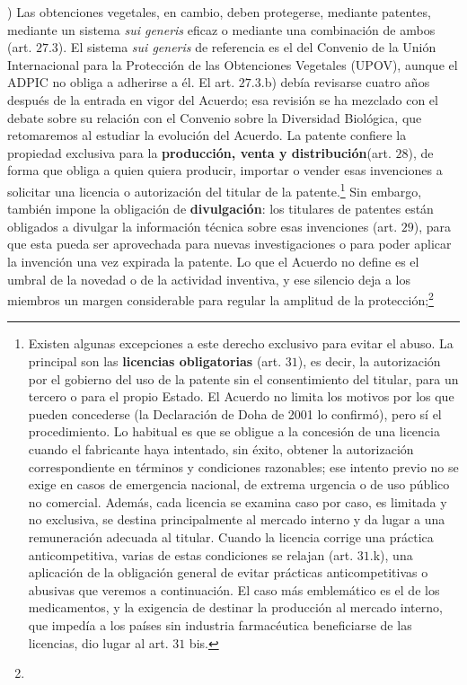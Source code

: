 \documentclass[10pt,a4paper]{article}
\newcounter{alphaitem}
\newenvironment{la}
      {\begin{list}{\alph{alphaitem})}{%
          \usecounter{alphaitem}%
          \setlength{\leftmargin}{1cm}%
          \setlength{\parskip}{3pt}%
          \setlength{\itemsep}{0pt}%
          \setlength{\parsep}{0pt}%
      }}
      {\end{list}}
\begin{document}
\begin{la}
{        Las obtenciones vegetales, en cambio, deben protegerse, mediante patentes, mediante un sistema \textit{sui generis} eficaz o mediante una combinación de ambos (art. $27.3$). El sistema \textit{sui generis} de referencia es el del Convenio de la Unión Internacional para la Protección de las Obtenciones Vegetales (UPOV), aunque el ADPIC no obliga a adherirse a él. El art. $27.3$.b) debía revisarse cuatro años después de la entrada en vigor del Acuerdo; esa revisión se ha mezclado con el debate sobre su relación con el Convenio sobre la Diversidad Biológica, que retomaremos al estudiar la evolución del Acuerdo.
    } La patente confiere la propiedad exclusiva para la \textbf{producción, venta y distribución}(art. $28$), de forma que obliga a quien quiera producir, importar o vender esas invenciones a solicitar una licencia o autorización del titular de la patente.\footnote{%
        Existen algunas excepciones a este derecho exclusivo para evitar el abuso. La principal son las \textbf{licencias obligatorias} (art. $31$), es decir, la autorización por el gobierno del uso de la patente sin el consentimiento del titular, para un tercero o para el propio Estado. El Acuerdo no limita los motivos por los que pueden concederse (la Declaración de Doha de 2001 lo confirmó), pero sí el procedimiento. Lo habitual es que se obligue a la concesión de una licencia cuando el fabricante haya intentado, sin éxito, obtener la autorización correspondiente en términos y condiciones razonables; ese intento previo no se exige en casos de emergencia nacional, de extrema urgencia o de uso público no comercial. Además, cada licencia se examina caso por caso, es limitada y no exclusiva, se destina principalmente al mercado interno y da lugar a una remuneración adecuada al titular. Cuando la licencia corrige una práctica anticompetitiva, varias de estas condiciones se relajan (art. $31$.k), una aplicación de la obligación general de evitar prácticas anticompetitivas o abusivas que veremos a continuación. El caso más emblemático es el de los medicamentos, y la exigencia de destinar la producción al mercado interno, que impedía a los países sin industria farmacéutica beneficiarse de las licencias, dio lugar al art. $31$ bis.
    } Sin embargo, también impone la obligación de \textbf{divulgación}: los titulares de patentes están obligados a divulgar la información técnica sobre esas invenciones (art. $29$), para que esta pueda ser aprovechada para nuevas investigaciones o para poder aplicar la invención una vez expirada la patente. Lo que el Acuerdo no define es el umbral de la novedad o de la actividad inventiva, y ese silencio deja a los miembros un margen considerable para regular la amplitud de la protección;\footnote{%
}
\end{la}
\end{document}
